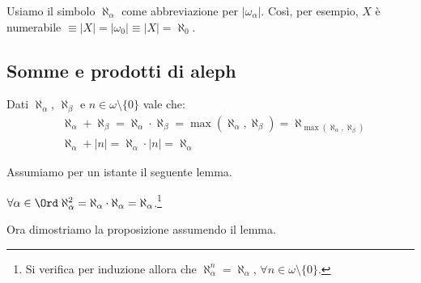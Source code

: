 \documentclass[11pt]{scrartcl}
\begin{document}
\begin{notation}[$|\omega_\alpha| = \aleph_\alpha$]
	Usiamo il simbolo $\aleph_\alpha$ come abbreviazione per $|\omega_\alpha|$. Così, per esempio, $X$ è numerabile $\equiv |X| = |\omega_0| \equiv |X| = \aleph_0$.
\end{notation}

\subsection{Somme e prodotti di aleph}

\begin{proposition}
	Dati $\aleph_\alpha$, $\aleph_\beta$ e $n \in \omega\setminus\{0\}$ vale che:
	\begin{align*}
		& \aleph_\alpha + \aleph_\beta = \aleph_\alpha \cdot\aleph_\beta = \max(\aleph_\alpha,\aleph_\beta) = \aleph_{\max(\aleph_\alpha,\aleph_\beta)} \\
		& \aleph_\alpha + |n| = \aleph_\alpha \cdot |n| = \aleph_\alpha
	\end{align*}
\end{proposition}

Assumiamo per un istante il seguente lemma.

\begin{lemma}[$\aleph_\alpha \cdot \aleph_\alpha = \aleph_\alpha$]
	$\forall \alpha \in \Ord \; \aleph_{\alpha}^2 = \aleph_\alpha \cdot \aleph_\alpha = \aleph_\alpha$.\footnote{Si verifica per induzione allora che $\aleph_\alpha^n = \aleph_\alpha$, $\forall n \in \omega\setminus\{0\}$.}
\end{lemma}

Ora dimostriamo la proposizione assumendo il lemma.
\end{document}
